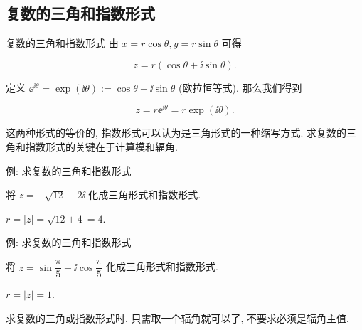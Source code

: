 \subsection{复数的三角和指数形式}


\begin{frame}{复数的三角和指数形式}
	\onslide<+->
	由 $x=r\cos\theta,y=r\sin\theta$ 可得
	\onslide<+->
	\begin{definition*}[][复数的三角形式]
	\[
		z=r(\cos\theta+\ii\sin\theta).
	\]
	\end{definition*}
	\onslide<+->
	定义 \alert{$\ee^{\ii\theta}=\exp(\ii\theta):=\cos\theta+\ii\sin\theta$} (欧拉恒等式).
	\onslide<+->
	那么我们得到
	\begin{definition*}[][复数的指数形式]
	\[
		z=r\ee^{\ii\theta}=r\exp(\ii\theta).
	\]
	\end{definition*}
	\onslide<+->
	这两种形式的等价的, 指数形式可以认为是三角形式的一种缩写方式.
	\onslide<+->
	求复数的三角和指数形式的\alert{关键在于计算模和辐角}.
\end{frame}


\begin{frame}{例: 求复数的三角和指数形式}
	\onslide<+->
	\begin{example}[nearnext]
		将 $z=-\sqrt{12}-2\ii$ 化成三角形式和指数形式.
	\end{example}
	\onslide<+->
	\begin{solution}[nearprev]
		$r=|z|=\sqrt{12+4}=4$.
		\onslide<+->{%
			故
			\[
				z=4\left[\cos\Bigl(-\frac{5\pi}6\Bigr)+\ii\sin\Bigl(-
				\frac{5\pi}6\Bigr)\right]=4\ee^{-\frac{5\pi\ii}6}.
			\]
		}
		\meddel
	\end{solution}
\end{frame}


\begin{frame}{例: 求复数的三角和指数形式}
	\beqskip{10pt}
	\onslide<+->
	\begin{example}[nearnext]
		将 $z=\sin\dfrac\pi5+\ii\cos\dfrac\pi5$ 化成三角形式和指数形式.
	\end{example}
	\onslide<+->
	\begin{solution}[nearprev]
		$r=|z|=1$.
		\onslide<+->{%
			\[
				z=\cos\frac{3\pi}{10}+\ii\sin\frac{3\pi}{10}=\ee^{\frac{3\pi\ii}{10}}.
			\]%
		}\bigdel
	\end{solution}
	\onslide<+->
	求复数的三角或指数形式时, 只需取一个辐角就可以了, 不要求必须是辐角主值.
	\endgroup
\end{frame}


